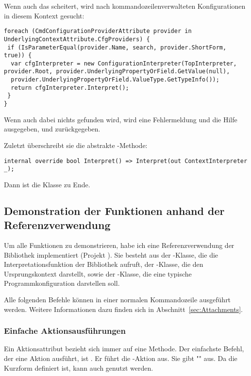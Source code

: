 Wenn auch das scheitert, wird nach kommandozeilenverwalteten Konfigurationen in diesem Kontext gesucht:
\begin{lstlisting}[title=""]
foreach (CmdConfigurationProviderAttribute provider in UnderlyingContextAttribute.CfgProviders) {
 if (IsParameterEqual(provider.Name, search, provider.ShortForm, true)) {
  var cfgInterpreter = new ConfigurationInterpreter(TopInterpreter, provider.Root, provider.UnderlyingPropertyOrField.GetValue(null),
  provider.UnderlyingPropertyOrField.ValueType.GetTypeInfo());
  return cfgInterpreter.Interpret();
 }
}
\end{lstlisting}
Wenn auch dabei nichts gefunden wird, wird eine Fehlermeldung und die Hilfe ausgegeben, und  zurückgegeben.

Zuletzt überschreibt sie die abstrakte -Methode:
\begin{lstlisting}[title=""]
 internal override bool Interpret() => Interpret(out ContextInterpreter _);
\end{lstlisting}
Dann ist die Klasse zu Ende.
\subsection{Demonstration der Funktionen anhand der Referenzverwendung}\label{subsec:demonstration}
Um alle Funktionen zu demonstrieren, habe ich eine Referenzverwendung der Bibliothek implementiert (Projekt ).
Sie besteht aus der -Klasse, die die Interpretationsfunktion der Bibliothek aufruft, der -Klasse, 
die den Ursprungskontext darstellt, sowie der -Klasse, die eine typische Programmkonfiguration darstellen soll.

Alle folgenden Befehle können in einer normalen Kommandozeile ausgeführt werden.
Weitere Informationen dazu finden sich in Abschnitt~\ref{sec:Attachments}.%
\subsubsection{Einfache Aktionsausführungen}
Ein Aktionsattribut bezieht sich immer auf eine Methode.
Der einfachste Befehl, der eine Aktion ausführt, ist .
Er führt die -Aktion aus.
Sie gibt "" aus.
Da die Kurzform  definiert ist, kann auch  genutzt werden.

